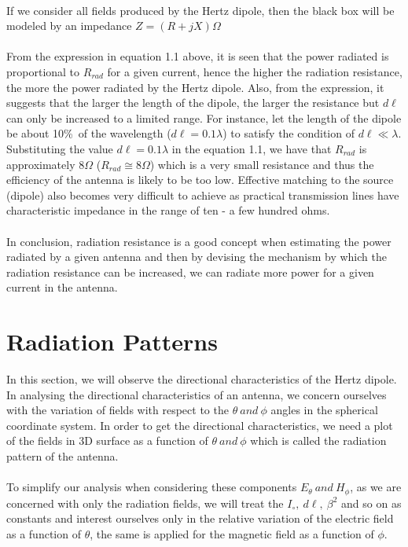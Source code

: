  \paragraph{}
 If we consider all fields produced by the Hertz dipole, then the black box will be modeled by an impedance $Z = (R + jX)\Omega$
 \\\\
 From the expression in equation 1.1 above, it is seen that the power radiated is proportional to $R_{rad}$ for a given current, hence the higher the radiation resistance, the more the power radiated by the Hertz dipole. Also, from the expression, it suggests that the larger the length of the dipole, the larger the resistance but $d\ell$ can only be increased to a limited range. For instance, let the length of the dipole be about 10\%\ of the wavelength ($d\ell = 0.1\lambda$) to satisfy the condition of $d\ell \ll \lambda$. Substituting the value $d\ell = 0.1\lambda$ in the equation 1.1, we have that $R_{rad}$ is approximately $8\Omega$ ($R_{rad} \cong 8\Omega$) which is a very small resistance and thus the efficiency of the antenna is likely to be too low. Effective matching to the source (dipole) also becomes very difficult to achieve as practical transmission lines have characteristic impedance in the range of ten - a few hundred ohms. 
 \paragraph{}
 In conclusion, radiation resistance is a good concept when estimating the power radiated by a given antenna and then by devising the mechanism by which the radiation resistance can be increased, we can radiate more power for a given current in the antenna. 
 
 \section{Radiation Patterns}
 In this section, we will observe the directional characteristics of the Hertz dipole. In analysing the directional characteristics of an antenna, we concern ourselves with the variation of fields with respect to the $\theta \ and \ \phi$ angles in the spherical coordinate system. In order to get the directional characteristics, we need a plot of the fields in 3D surface as a function of $\theta \ and \ \phi$ which is called the radiation pattern of the antenna. 
 
 \paragraph{}
 To simplify our analysis when considering these components $E_\theta \ and \ H_\phi$, as we are concerned with only the radiation fields, we will treat the $I_\circ, \ d\ell, \ \beta^2$ and so on as constants and interest ourselves only in the relative variation of the electric field as a function of $\theta$, the same is applied for the magnetic field as a function of $\phi$.

